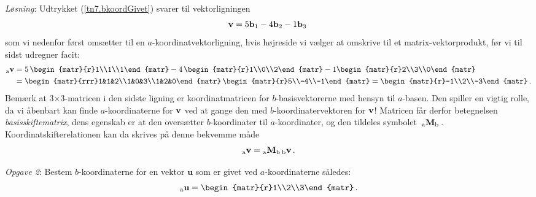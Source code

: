 \textit{Løsning}:
Udtrykket (\ref{tn7.bkoordGivet}) svarer til vektorligningen
$$
\mathbf{v}=5\mathbf{b}_1-4\mathbf{b}_2-1\mathbf{b}_3\
$$
som vi nedenfor først omsætter til en $a$-koordinatvektorligning, hvis højreside vi vælger at omskrive til et matrix-vektorprodukt, før vi til sidst udregner facit: 
\begin{align*}
\vekind av&= 5\,\begin{matr}{r}1\\1\\1\end{matr}-4\,\begin{matr}{r}1\\0\\2\end{matr}-1\begin{matr}{r}2\\3\\0\end{matr}
\medskip\\
&=\begin{matr}{rrr}1&1&2\\1&0&3\\1&2&0\end{matr}\,
\begin{matr}{r}5\\-4\\-1\end{matr}=
\begin{matr}{r}-1\\2\\-3\end{matr}\,.
\end{align*}
Bemærk at 3$\times$3-matricen i den sidste ligning er koordinatmatricen for $b$-basisvektorerne med hensyn til $a$-basen. Den spiller en vigtig rolle, da vi åbenbart kan finde $a$-koordinaterne for $\mathbf{v}$ ved at gange den med $b$-koordinatervektoren for $\mathbf{v}$! Matricen får derfor betegnelsen \textit{basisskiftematrix}, dens egenskab er at den oversætter $b$-koordinater til $a$-koordinater, og den tildeles symbolet $\,{_\mathrm{a}\mathbf{M}_\mathrm{b}}\,$. Koordinatskifterelationen kan da skrives på denne bekvemme måde
\begin{equation}\label{tn7.basisskifte}
{_\mathrm{a}\mathbf{v}} = {_\mathrm{a}\mathbf{M}_\mathrm{b}}\,{_\mathrm{b}\mathbf{v}}\,.
\end{equation}

\textit{Opgave 2}: Bestem $b$-koordinaterne for en vektor $\mathbf u$ som er givet ved $a$-koordinaterne således:
\begin{equation}\label{tn7.akoordGivet}
\vekind au=\begin{matr}{r}1\\2\\3\end{matr}\,.
\end{equation}

